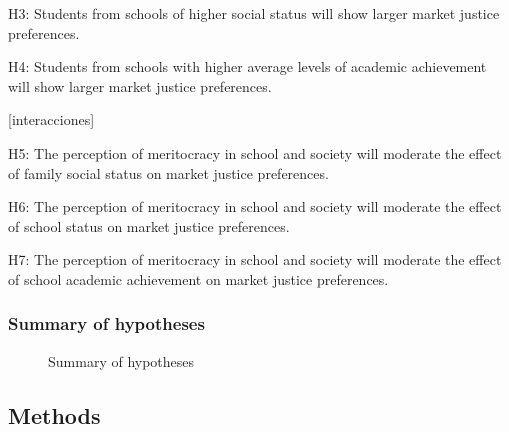 \documentclass[
  letterpaper,
  DIV=11,
  numbers=noendperiod]{scrartcl}
\begin{document}
H3: Students from schools of higher social status will show larger
market justice preferences.

H4: Students from schools with higher average levels of academic
achievement will show larger market justice preferences.

{[}interacciones{]}

H5: The perception of meritocracy in school and society will moderate
the effect of family social status on market justice preferences.

H6: The perception of meritocracy in school and society will moderate
the effect of school status on market justice preferences.

H7: The perception of meritocracy in school and society will moderate
the effect of school academic achievement on market justice preferences.

\subsubsection{Summary of hypotheses}\label{summary-of-hypotheses}

\begin{figure}


\caption{\label{fig-hypotheses}Summary of hypotheses}

\end{figure}%

\subsection{}\label{section}

\subsection{Methods}\label{methods}
\end{document}
